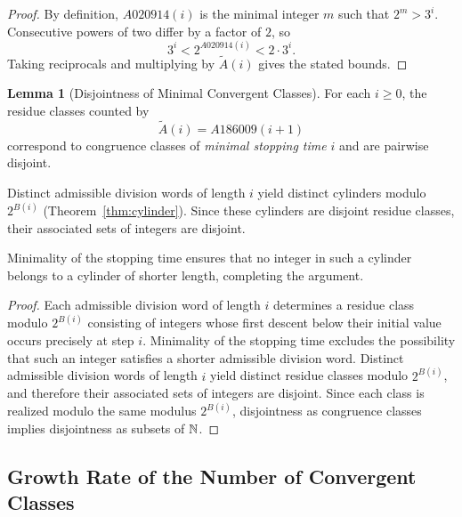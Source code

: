 \documentclass[12pt, oneside]{article}   	%
\numberwithin{equation}{section}          %
\theoremstyle{definition}
\newtheorem{lemma}[theorem]{Lemma}
\begin{document}
\begin{proof}
By definition, $A020914(i)$ is the minimal integer $m$ such that $2^m > 3^i$.
Consecutive powers of two differ by a factor of $2$, so
\[
3^i < 2^{A020914(i)} < 2 \cdot 3^i.
\]
Taking reciprocals and multiplying by $\widetilde A(i)$ gives the stated bounds.
\end{proof}

\begin{lemma}[Disjointness of Minimal Convergent Classes]
\label{lem:disjoint-classes}
For each $i \ge 0$, the residue classes counted by
\[
\widetilde A(i) = A186009(i+1)
\]
correspond to congruence classes of \emph{minimal stopping time} $i$ and are pairwise disjoint.  

Distinct admissible division words of length $i$ yield distinct cylinders
modulo $2^{B(i)}$ (Theorem~\ref{thm:cylinder}). Since these cylinders are
disjoint residue classes, their associated sets of integers are disjoint.

Minimality of the stopping time ensures that no integer in such a cylinder
belongs to a cylinder of shorter length, completing the argument.
\end{lemma}

\begin{proof}
Each admissible division word of length $i$ determines a residue class modulo
$2^{B(i)}$ consisting of integers whose first descent below their initial value
occurs precisely at step $i$. Minimality of the stopping time excludes the
possibility that such an integer satisfies a shorter admissible division word.
Distinct admissible division words of length $i$ yield distinct residue classes
modulo $2^{B(i)}$, and therefore their associated sets of integers are disjoint.
Since each class is realized modulo the same modulus $2^{B(i)}$, disjointness
as congruence classes implies disjointness as subsets of $\mathbb{N}$.
\end{proof}


\subsection{Growth Rate of the Number of Convergent Classes}
\end{document}
